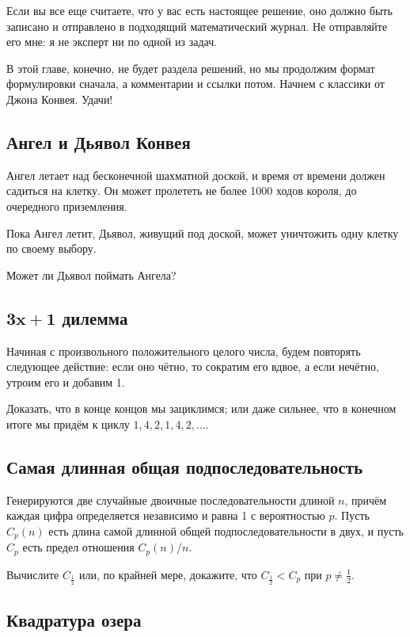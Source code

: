 Если вы все еще считаете, что у вас есть настоящее решение, оно должно быть записано и отправлено в подходящий математический журнал.
Не отправляйте его мне: я не эксперт ни по одной из задач.

\medskip

В этой главе, конечно, не будет раздела решений, но мы продолжим формат формулировки сначала, а комментарии и ссылки потом.
Начнем с классики от Джона Конвея.
Удачи!


\subsection*{Ангел и Дьявол Конвея}

Ангел летает над бесконечной шахматной доской, и время от времени должен садиться на клетку.
Он может пролететь не более 1000 ходов короля, до очередного приземления.

Пока Ангел летит, Дьявол, живущий под доской, может уничтожить одну клетку по своему выбору.

Может ли Дьявол поймать Ангела?

\subsection*{$\bm{3x+1}$ дилемма}

Начиная с произвольного положительного целого числа, будем повторять следующее действие: если оно чётно, то сократим его вдвое, а если нечётно, утроим его и добавим 1.

Доказать, что в конце концов мы зациклимся; или даже сильнее, что в конечном итоге мы придём к циклу $1, 4, 2, 1, 4, 2,\dots$.

\subsection*{Самая длинная общая подпоследовательность}
Генерируются две случайные двоичные последовательности длиной $n$, причём каждая цифра определяется независимо и равна 1 с вероятностью $p$.
Пусть $C_p(n)$ есть длина самой длинной общей подпоследовательности в двух, и пусть $C_p$ есть предел отношения $C_p(n)/n$.

Вычислите $C_{\frac12}$ или, по крайней мере, докажите, что $C_{\frac12}<C_{p}$ при $p\ne\tfrac12$.

\subsection*{Квадратура озера}

